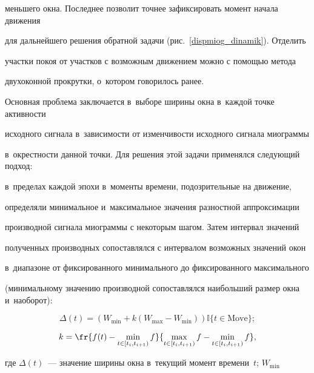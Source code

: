 меньшего окна. Последнее позволит точнее зафиксировать момент начала движения 

для дальнейшего решения обратной задачи (рис.~\ref{dispmiog_dinamik}). Отделить 

участки покоя от участков с возможным движением можно с помощью метода 

двухоконной прокрутки, о~котором говорилось ранее.



Основная проблема заключается в~выборе ширины окна в~каждой точке активности 

исходного сигнала в~зависимости от изменчивости исходного сигнала миограммы 

в~окрестности данной точки. Для решения этой задачи применялся следующий подход: 

в~пределах каждой эпохи в~моменты времени, подозрительные на движение, 

определяли минимальное и~максимальное значения разностной аппроксимации 

производной сигнала миограммы с некоторым шагом. Затем интервал значений 

полученных производных сопоставлялся с интервалом возможных значений окон 

в~диапазоне от фиксированного минимального до фиксированного максимального 

(минимальному значению производной со\-по\-став\-лял\-ся наибольший размер окна и~наоборот):


\begin{equation*}

\Delta(t) = \left(W_{\min} + k\left(W_{\max} - W_{\min}\right)\right)

\mathbb{I}\{ t \in \mathrm{Move} \};

\end{equation*}



\noindent

\begin{equation*}

k = \fr{f(t) - \min_{t \in [t_i,t_{i+1})} f}{ \max_{t \in 

[t_i,t_{i+1})} f - \min_{ t \in [t_i,t_{i+1}) } f},

\end{equation*}

где $\Delta(t)$~--- значение ширины окна в~текущий момент времени~$t$; $W_{\min}$ 

